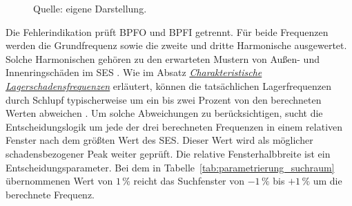 \begin{figure}[htbp]
  \centering
  \caption{Vereinfachter Datenfluss der Verarbeitungspipeline}
  \label{fig:verarbeitungspipeline_datenfluss}
  \caption*{\footnotesize Quelle: eigene Darstellung.}
\end{figure}

\label{par:fehlerindikation_pipeline}

Die Fehlerindikation prüft BPFO und BPFI getrennt. Für beide Frequenzen werden
die Grundfrequenz sowie die zweite und dritte Harmonische ausgewertet. Solche
Harmonischen gehören zu den erwarteten Mustern von Außen- und
Innenringschäden im \acrshort{SES}
\cite[S.~103, Tab.~1]{smithRollingElementBearing2015}.
Wie im Absatz
\hyperref[par:charakteristische_lagerschadensfrequenzen]
{\emph{Charakteristische Lagerschadensfrequenzen}} erläutert, können die
tatsächlichen Lagerfrequenzen durch Schlupf typischerweise um ein bis zwei
Prozent von den berechneten Werten abweichen
\cite[S.~487, Abschn.~1]{randallRollingElementBearing2011a}. Um solche
Abweichungen zu berücksichtigen, sucht die Entscheidungslogik um jede der drei
berechneten Frequenzen in einem relativen Fenster nach dem größten Wert des
\acrshort{SES}. Dieser Wert wird als möglicher schadensbezogener Peak weiter
geprüft. Die relative Fensterhalbbreite ist ein Entscheidungsparameter. Bei
dem in Tabelle~\ref{tab:parametrierung_suchraum} übernommenen Wert von
$1\,\%$ reicht das Suchfenster von $-1\,\%$ bis $+1\,\%$ um die berechnete
Frequenz.


